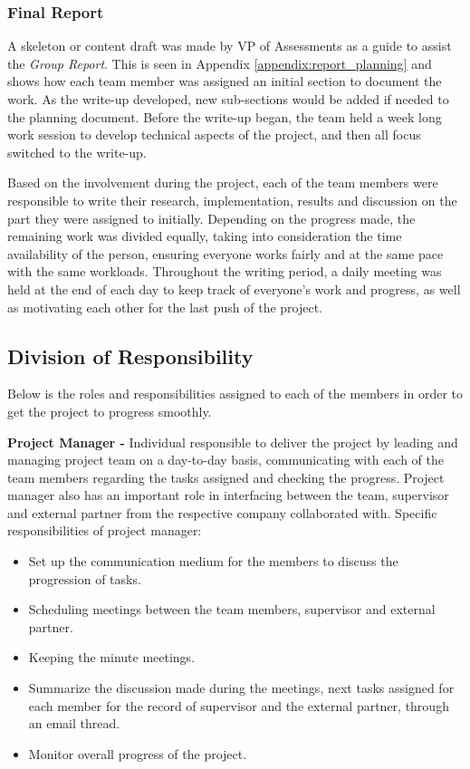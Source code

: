 \subsubsection{Final Report}
A skeleton or content draft was made by VP of Assessments as a guide to assist the \textit{Group Report}. This is seen in Appendix \ref{appendix:report_planning} and shows how each team member was assigned an initial section to document the work. As the write-up developed, new sub-sections would be added if needed to the planning document. Before the write-up began, the team held a week long work session to develop technical aspects of the project, and then all focus switched to the write-up. 

Based on the involvement during the project, each of the team members were responsible to write their research, implementation, results and discussion on the part they were assigned to initially. Depending on the progress made, the remaining work was divided equally, taking into consideration the time availability of the person, ensuring everyone works fairly and at the same pace with the same workloads. Throughout the writing period, a daily meeting was held at the end of each day to keep track of everyone’s work and progress, as well as motivating each other for the last push of the project.

\subsection{Division of Responsibility}
\label{section: division of responsibility}
Below is the roles and responsibilities assigned to each of the members in order to get the project to progress smoothly. 

\textbf{Project Manager - }
Individual responsible to deliver the project by leading and managing project team on a day-to-day basis, communicating with each of the team members regarding the tasks assigned and checking the progress. Project manager also has an important role in interfacing between the team, supervisor and external partner from the respective company collaborated with. Specific responsibilities of project manager:
\begin{itemize}
    \item Set up the communication medium for the members to discuss the progression of tasks.
    \item Scheduling meetings between the team members, supervisor and external partner.
    \item Keeping the minute meetings.
    \item Summarize the discussion made during the meetings, next tasks assigned for each member for the record of supervisor and the external partner, through an email thread.
    \item Monitor overall progress of the project.
\end{itemize}

